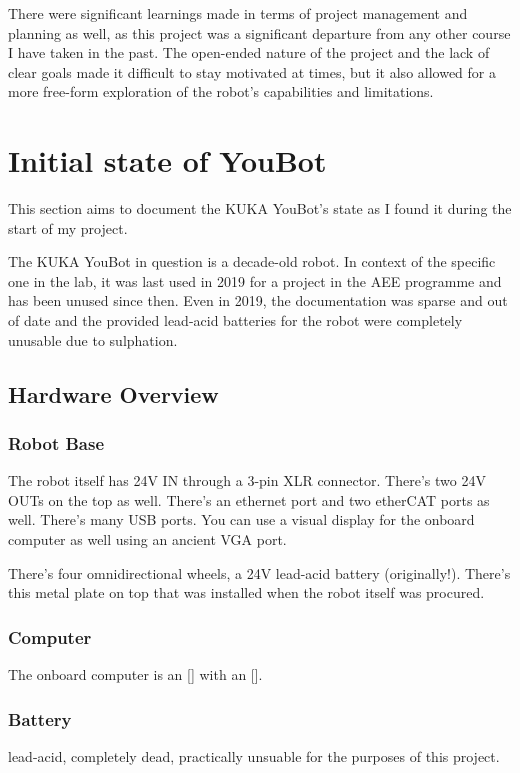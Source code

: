 \documentclass[a4paper, 12pt]{article}
\begin{document}
    There were significant learnings made in terms of project management and planning as well, as this project was a significant departure from any other course I have taken in the past. The open-ended nature of the project and the lack of clear goals made it difficult to stay motivated at times, but it also allowed for a more free-form exploration of the robot's capabilities and limitations.
        

    \pagebreak

    \section{Initial state of YouBot}

    This section aims to document the KUKA YouBot's state as I found it during the start of my project. 

    The KUKA YouBot in question is a decade-old robot. In context of the specific one in the lab, it was last used in 2019 for a project in the AEE programme and has been unused since then. Even in 2019, the documentation was sparse and out of date and the provided lead-acid batteries for the robot were completely unusable due to sulphation. 

    \subsection{Hardware Overview}
    \subsubsection{Robot Base}
    The robot itself has 24V IN through a 3-pin XLR connector. There's two 24V OUTs on the top as well. There's an ethernet port and two etherCAT ports as well.
    There's many USB ports. You can use a visual display for the onboard computer as well using an ancient VGA port. \cite{githubYoubotOverview}

    There's four omnidirectional wheels, a 24V lead-acid battery (originally!). There's this metal plate on top that was installed when the robot itself was procured. 

    \subsubsection{Computer}
    The onboard computer is an [] with an []. 


    \subsubsection{Battery}
    lead-acid, completely dead, practically unsuable for the purposes of this project. 
\end{document}
